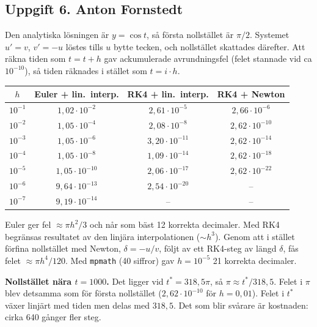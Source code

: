 \documentclass{article}
\begin{document}
\subsection*{Uppgift 6. Anton Fornstedt}

Den analytiska lösningen är $y = \cos t$, så första nollstället är $\pi/2$.
Systemet $u' = v$, $v' = -u$ löstes tills $u$ bytte tecken, och nollstället
skattades därefter. Att räkna tiden som $t = t + h$ gav ackumulerade
avrundningsfel (felet stannade vid ca $10^{-10}$), så tiden räknades i stället
som $t = i \cdot h$.

\begin{center}
\begin{tabular}{c c c c}
\hline
$h$ & Euler + lin.\ interp. & RK4 + lin.\ interp. & RK4 + Newton \\
\hline
$10^{-1}$ & $1{,}02 \cdot 10^{-2}$  & $2{,}61 \cdot 10^{-5}$  & $2{,}66 \cdot 10^{-6}$ \\
$10^{-2}$ & $1{,}05 \cdot 10^{-4}$  & $2{,}08 \cdot 10^{-8}$  & $2{,}62 \cdot 10^{-10}$ \\
$10^{-3}$ & $1{,}05 \cdot 10^{-6}$  & $3{,}20 \cdot 10^{-11}$ & $2{,}62 \cdot 10^{-14}$ \\
$10^{-4}$ & $1{,}05 \cdot 10^{-8}$  & $1{,}09 \cdot 10^{-14}$ & $2{,}62 \cdot 10^{-18}$ \\
$10^{-5}$ & $1{,}05 \cdot 10^{-10}$ & $2{,}06 \cdot 10^{-17}$ & $2{,}62 \cdot 10^{-22}$ \\
$10^{-6}$ & $9{,}64 \cdot 10^{-13}$ & $2{,}54 \cdot 10^{-20}$ & -- \\
$10^{-7}$ & $9{,}19 \cdot 10^{-14}$ & -- & -- \\
\hline
\end{tabular}
\end{center}

Euler ger fel $\approx \pi h^2/3$ och når som bäst 12 korrekta decimaler.
Med RK4 begränsas resultatet av den linjära interpolationen ($\sim h^3$).
Genom att i stället förfina nollstället med Newton,
$\delta = -u/v$, följt av ett RK4-steg av längd $\delta$, fås felet
$\approx \pi h^4/120$. Med \texttt{mpmath} (40 siffror) gav $h = 10^{-5}$
21 korrekta decimaler.

\medskip
\textbf{Nollstället nära $t = 1000$.} Det ligger vid $t^* = 318{,}5\pi$, så
$\pi \approx t^*/318{,}5$. Felet i $\pi$ blev detsamma som för första
nollstället ($2{,}62 \cdot 10^{-10}$ för $h = 0{,}01$). Felet i $t^*$ växer
linjärt med tiden men delas med $318{,}5$. Det som blir svårare är
kostnaden: cirka 640 gånger fler steg.
\end{document}
